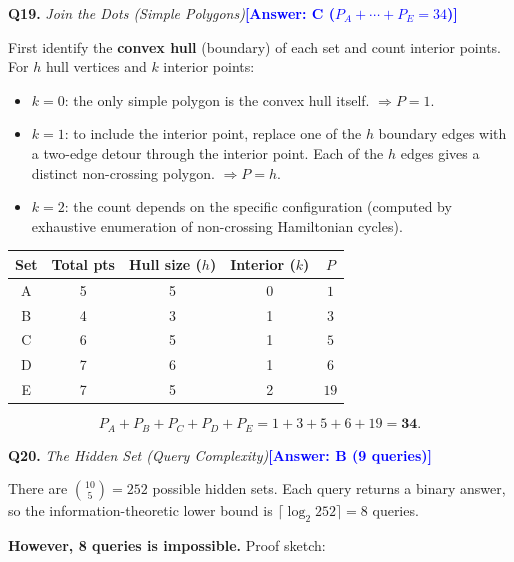 \documentclass[a4paper,12pt]{article}
\newcommand{\ans}[1]{\textcolor{blue}{\textbf{[Answer: #1]}}}
\newcommand{\qsol}[3]{%
  \vspace{1.5ex}%
  \noindent\textbf{Q#1.} \textit{#2}\quad\ans{#3}%
  \par\vspace{0.4ex}%
}
\begin{document}
\qsol{19}{Join the Dots (Simple Polygons)}{C ($P_A+\cdots+P_E = 34$)}

First identify the \textbf{convex hull} (boundary) of each set and count
interior points. For $h$ hull vertices and $k$ interior points:
\begin{itemize}[nosep]
  \item $k=0$: the only simple polygon is the convex hull itself.
    $\Rightarrow P = 1$.
  \item $k=1$: to include the interior point, replace one of the $h$
    boundary edges with a two-edge detour through the interior point.
    Each of the $h$ edges gives a distinct non-crossing polygon.
    $\Rightarrow P = h$.
  \item $k=2$: the count depends on the specific configuration
    (computed by exhaustive enumeration of non-crossing Hamiltonian cycles).
\end{itemize}

\begin{center}
\begin{tabular}{ccccc}
\toprule
Set & Total pts & Hull size ($h$) & Interior ($k$) & $P$ \\
\midrule
A & 5 & 5 & 0 & $1$ \\
B & 4 & 3 & 1 & $3$ \\
C & 6 & 5 & 1 & $5$ \\
D & 7 & 6 & 1 & $6$ \\
E & 7 & 5 & 2 & $19$ \\
\bottomrule
\end{tabular}
\end{center}

\[
  P_A + P_B + P_C + P_D + P_E = 1 + 3 + 5 + 6 + 19 = \mathbf{34}.
\]

\qsol{20}{The Hidden Set (Query Complexity)}{B (9 queries)}

There are $\binom{10}{5} = 252$ possible hidden sets. Each query returns a
binary answer, so the information-theoretic lower bound is
$\lceil\log_2 252\rceil = 8$ queries.

\textbf{However, 8 queries is impossible.} Proof sketch:
\end{document}
